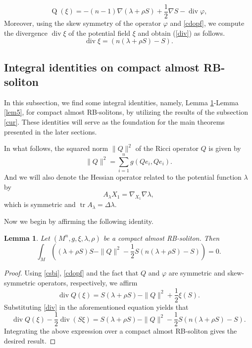 \documentclass[a4paper, twoside, 10pt]{article}
\numberwithin{equation}{section}
\newtheorem{lemma}{Lemma}[section]
\theoremstyle{definition}
\begin{document}
\begin{equation}\label{rorbs}
    \operatorname{Q}(\xi)=-(n-1)\nabla (\lambda +\rho S) + \frac{1}{2}\nabla S-\operatorname{div}\varphi,
\end{equation}
 Moreover, 
using the skew symmetry of the operator $\varphi$ and  \eqref{cdopf}, we compute the divergence $\operatorname{div} \xi$ of the potential field $\xi$ and obtain  (\ref{div}) as
follows.
\begin{equation}\label{div}
    \operatorname{div} \xi=(n (\lambda +\rho S)-S).
\end{equation}







\subsection{Integral identities on compact almost RB-soliton}
\label{inid}
In this subsection, we find some integral identities, namely, Lemma \ref{lem1}-Lemma \ref{lem5}, for compact almost RB-solitons, by utilizing the results of the subsection \ref{cur}. These identities will serve as the foundation for the main theorems presented in the later sections. 
 

In what follows, the squared norm $\|Q\|^{2}$ of the Ricci operator $Q$ is given by
\[
\|Q\|^{2}=\sum_{i=1}^{n} g\left(Q e_{i}, Q e_{i}\right).
\]
And we will also denote the  Hessian operator
related to the potential function $\lambda$  by
\[
A_\lambda X_1=\nabla_{X_1}\nabla\lambda,
\]
which is symmetric and $\operatorname{tr}A_\lambda=
\Delta\lambda.$


Now we begin by affirming the following identity. 
\begin{lemma}\label{lem1}
    Let $(M^n, g, \xi, \lambda,\rho)$ be a compact almost RB-soliton. Then
\begin{equation}\label{e1}
\int_{M}\left((\lambda+\rho S)S -\|Q\|^{2}-\frac{1}{2} S(n (\lambda +\rho S)-S)\right)=0.
\end{equation}
\end{lemma}
\begin{proof}
Using  \eqref{csbi}, \eqref{cdopf} and the fact that $Q$ and $\varphi$ are symmetric and skew-symmetric operators, respectively, we affirm
$$\operatorname{div} Q(\xi)=S(\lambda +\rho S)-\|Q\|^{2}+\frac{1}{2} \xi(S).$$
Substituting \eqref{div} in the aforementioned
equation yields that
$$
\operatorname{div} Q(\xi)-\frac{1}{2} \operatorname{div}(S \xi)= S(\lambda +\rho S)-\|Q\|^{2}-\frac{1}{2} S(n (\lambda +\rho S)-S).
$$
 Integrating the above expression over a compact almost RB-soliton gives the desired result.
\end{proof}
\end{document}
